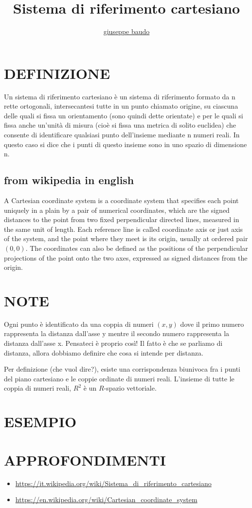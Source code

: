 \documentclass[a4paper,10pt]{article}
\title{Sistema di riferimento cartesiano}
\author{\href{http://www.baudo.hol.es}{giuseppe baudo}}
\begin{document}
\maketitle

\section{DEFINIZIONE}
Un sistema di riferimento cartesiano è un sistema di riferimento formato da n rette ortogonali, intersecantesi tutte in un punto
chiamato origine, su ciascuna delle quali si fissa un orientamento (sono quindi dette orientate) e per le quali si fissa
anche un'unità di misura (cioè si fissa una metrica di solito euclidea) che consente di identificare qualsiasi punto dell'insieme
mediante n numeri reali. In questo caso si dice che i punti di questo insieme sono in uno spazio di dimensione n.

\subsection{from wikipedia in english}
A Cartesian coordinate system is a coordinate system that specifies each point uniquely in a plain by a pair of numerical coordinates,
which are the signed distances to the point from two fixed perpendicular directed lines, measured in the same unit of length.
Each reference line is called coordinate axis or just axis of the system, and the point where they meet is its origin, usually at
ordered pair $(0, 0)$. The coordinates can also be defined as the positions of the perpendicular projections of the point onto the
two axes, expressed as signed distances from the origin.

\section{NOTE}
Ogni punto è identificato da una coppia di numeri $(x,y)$ dove il primo numero rappresenta la distanza dall'asse y mentre il secondo
numero rappresenta la distanza dall'asse x. Pensateci è proprio così! Il fatto è che se parliamo di distanza, allora dobbiamo definire
che cosa si intende per distanza.

Per definizione (che vuol dire?), esiste una corrispondenza biunivoca fra i punti del piano cartesiano e le coppie ordinate di 
numeri reali. L'insieme di tutte le coppia di numeri reali, $R^2$ è un $R$-spazio vettoriale.

\section{ESEMPIO}

\section{APPROFONDIMENTI}
\begin{itemize}
 \item \url{https://it.wikipedia.org/wiki/Sistema_di_riferimento_cartesiano}
 \item \url{https://en.wikipedia.org/wiki/Cartesian_coordinate_system}
\end{itemize}
\end{document}

